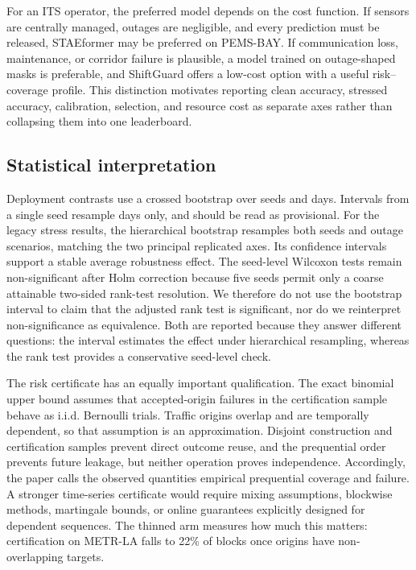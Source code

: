\documentclass[preprint,12pt]{elsarticle}
\begin{document}
For an ITS operator, the preferred model depends on the cost function. If
sensors are centrally managed, outages are negligible, and every prediction
must be released, STAEformer may be preferred on PEMS-BAY. If communication
loss, maintenance, or corridor failure is plausible, a model trained on
outage-shaped masks is preferable, and ShiftGuard offers a low-cost option with a
useful risk--coverage profile.
This distinction motivates reporting clean accuracy, stressed accuracy,
calibration, selection, and resource cost as separate axes rather than
collapsing them into one leaderboard.

\subsection{Statistical interpretation}
Deployment contrasts use a crossed bootstrap over seeds and days. Intervals from a
single seed resample days only, and should be read as provisional. For the legacy
stress results, the hierarchical bootstrap resamples both seeds and outage scenarios, matching
the two principal replicated axes. Its confidence intervals support a stable
average robustness effect. The seed-level Wilcoxon tests remain non-significant
after Holm correction because five seeds permit only a coarse attainable
two-sided rank-test resolution. We therefore do not use the bootstrap interval
to claim that the adjusted rank test is significant, nor do we reinterpret
non-significance as equivalence. Both are reported because they answer
different questions: the interval estimates the effect under hierarchical
resampling, whereas the rank test provides a conservative seed-level check.

The risk certificate has an equally important qualification. The exact
binomial upper bound assumes that accepted-origin failures in the certification
sample behave as i.i.d. Bernoulli trials. Traffic origins overlap and are
temporally dependent, so that assumption is an approximation. Disjoint
construction and certification samples prevent direct outcome reuse, and the
prequential order prevents future leakage, but neither operation proves
independence. Accordingly, the paper calls the observed quantities empirical
prequential coverage and failure. A stronger time-series certificate would
require mixing assumptions, blockwise methods, martingale bounds, or online
guarantees explicitly designed for dependent sequences. The thinned arm measures
how much this matters: certification on METR-LA falls to 22\% of blocks once origins
have non-overlapping targets.
\end{document}
